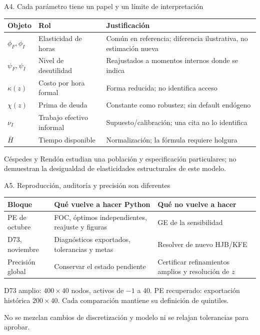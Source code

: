 \documentclass[aspectratio=169,11pt]{beamer}
\newcommand{\source}[1]{\par\vfill{\fontsize{8}{9.5}\selectfont\color{Gray}#1\par}}
\newcommand{\back}[1]{\hfill\hyperlink{#1}{\beamerreturnbutton{Volver}}}
\begin{document}
\begin{frame}[label=parametros]{A4. Cada parámetro tiene un papel y un límite de interpretación}
\small\renewcommand{\arraystretch}{1.5}
\begin{tabular}{@{}p{2cm}p{6cm}p{8cm}@{}}\toprule
Objeto&Rol&Justificación\\\midrule
$\phi_F,\phi_I$&Elasticidad de horas&Común en referencia; diferencia ilustrativa, no estimación nueva\\
$\psi_F,\psi_I$&Nivel de desutilidad&Reajustados a momentos internos donde se indica\\
$\kappa(z)$&Costo por hora formal&Forma reducida; no identifica acceso\\
$\chi(z)$&Prima de deuda&Constante como robustez; sin default endógeno\\
$\nu_I$&Trabajo efectivo informal&Supuesto/calibración; una cita no lo identifica\\
$\bar H$&Tiempo disponible&Normalización; la fórmula requiere holgura\\\bottomrule
\end{tabular}
\source{Céspedes y Rendón estudian una población y especificación particulares; no demuestran la desigualdad de elasticidades estructurales de este modelo.}\back{modelo}
\end{frame}

\begin{frame}[label=precision]{A5. Reproducción, auditoría y precisión son diferentes}
\small\renewcommand{\arraystretch}{1.5}
\begin{tabular}{@{}p{4cm}p{6.5cm}p{5.4cm}@{}}\toprule
Bloque&Qué vuelve a hacer Python&Qué no vuelve a hacer\\\midrule
PE de octubre&FOC, óptimos independientes, reajuste y figuras&GE de la sensibilidad\\
D73, noviembre&Diagnósticos exportados, tolerancias y metas&Resolver de nuevo HJB/KFE\\
Precisión global&Conservar el estado pendiente&Certificar refinamientos amplios y resolución de $z$\\\bottomrule
\end{tabular}
\vspace{3mm}
D73 amplio: $400\times40$ nodos, activos de $-1$ a 40. PE recuperado: exportación histórica $200\times40$. Cada comparación mantiene su definición de quintiles.
\source{No se mezclan cambios de discretización y modelo ni se relajan tolerancias para aprobar.}\back{verificacion}
\end{frame}
\end{document}
